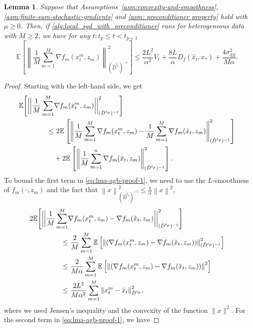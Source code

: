 \documentclass[sn-mathphys,Numbered]{sn-jnl}%
\newtheorem{lemma}{Lemma}%
\renewcommand{\|}{\parallel}
\newcommand\ec[2][]{\ensuremath{\mathbb{E}_{#1} \left[#2\right]}}
\newcommand\ecn[3][]{\ec[#1]{\norm{#2}^2_{#3}}}
\newcommand{\norm}[1]{\left\lVert#1\right\rVert}
\newcommand{\sqn}[1]{{\left\lVert#1\right\rVert}^2}
\newcommand{\sigmaf}{\sigma_{\mathrm{dif}}}
\renewcommand {\*} {\ast}
\begin{document}
\begin{lemma}
    \label{lemma:average-gradient-bound}
    Suppose that Assumptions~\ref{asm:convexity-and-smoothness}, \ref{asm:finite-sum-stochastic-gradients} and \ref{asm: preconditioner property} hold with $\mu \geq 0$. Then, if \cref{alg:local_sgd_with_preconditioner} runs for heterogeneous data with $M \geq 2$, we have for any $t:t_p \leq t < t_{p+1}$
    \begin{equation}
        \label{eq:lma-average-gradient-bound}
        \ecn{\frac{1}{M}\sum\limits_{m=1}^M \nabla f_m(x_t^m, z_m)}{(\hat{D}^{t_p})^{-1}} \leq  \frac{2L^2}{\alpha^2} V_t + \frac{8L}{\alpha} D_{f} (\hat{x}_t, x_\ast) + \frac{4 \sigmaf^2}{M\alpha}.
    \end{equation}
\end{lemma}
\begin{proof}
    Starting with the left-hand side, we get
    \begin{align}
        \label{eq:lma-agb-proof-1}
        \mathbb{E}\Bigg[ \bigg{|} \bigg{|}\frac{1}{M}\sum\limits_{m=1}^M &\nabla f_m(x_t^m, z_m)\bigg{|} \bigg{|}^2_{(\hat{D}^{t_p})^{-1}}\Bigg] \nonumber \\ \leq&\ 2 \ecn{\frac{1}{M}\sum\limits_{m=1}^M \nabla f_m(x_t^m, z_m) - \frac{1}{M} \sum_{m=1}^{M}\nabla f_m (\hat{x}_t, z_m) }{(\hat{D}^{t_p})^{-1} } \nonumber \\ &+ 2 \ecn{ \frac{1}{M} \sum_{m=1}^{n} \nabla f_m (\hat{x}_t, z_m) }{(\hat{D}^{t_p})^{-1}}.
    \end{align}
    To bound the first term in \eqref{eq:lma-agb-proof-1}, we need to use the $L$-smoothness of $f_m (\cdot, z_m)$ and the fact that $\sqn{x}_{(\hat{D}^{t_p})^{-1}} \leq \frac{1}{\alpha}\sqn{x}$,
    \begin{align}
       2 \mathbb{E}\Bigg[ \bigg{|} \bigg{|} \frac{1}{M} \sum_{m=1}^{M} &\nabla f_m (x_t^m, z_m) -  \nabla f_m (\hat{x}_t, z_m)\bigg{|} \bigg{|}^2_{(\hat{D}^{t_p})^{-1}}\Bigg] \nonumber \\ \leq&\ \frac{2}{M} \sum_{m=1}^{M} \ecn{(\nabla f_m (x_t^m, z_m) - \nabla f_m (\hat{x}_t, z_m))}{(\hat{D}^{t_p})^{-1}} \nonumber \\
       \leq&\ \frac{2}{M\alpha} \sum_{m=1}^{M} \ecn{(\nabla f_m (x_t^m, z_m) - \nabla f_m (\hat{x}_t, z_m))}{} \nonumber \\
        \label{eq:lma-agb-proof-2}
        \leq&\  \frac{2 L^2}{M\alpha^2} \sum_{m=1}^{M} \sqn{x_t^m - \hat{x}_t}_{\hat{D}^{t_p}},
    \end{align}
    where we used Jensen's inequality and the convexity of the function $\|x\|^2$. For the second term in \eqref{eq:lma-agb-proof-1}, we have

\end{proof}
\end{document}
